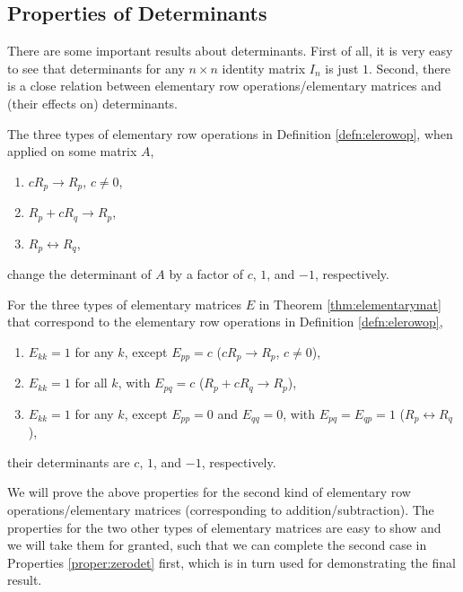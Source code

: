 \subsection{Properties of Determinants} There are some important results about determinants. First of all, it is very easy to see that determinants for any $n \times n$ identity matrix $I_n$ is just $1$. Second, there is a close relation between elementary row operations/elementary matrices and (their effects on) determinants.
\begin{proper}
\label{proper:elementaryopdet}
The three types of elementary row operations in Definition \ref{defn:elerowop}, when applied on some matrix $A$,
\begin{enumerate}
\item $cR_{p} \to R_{p}$, $c \neq 0$,
\item $R_{p} + cR_{q} \to R_{p}$,
\item $R_{p} \leftrightarrow R_{q}$,
\end{enumerate}
change the determinant of $A$ by a factor of $c$, $1$, and $-1$, respectively.
\end{proper}
\begin{proper}
\label{proper:elementarymatdet}
For the three types of elementary matrices $E$ in Theorem \ref{thm:elementarymat} that correspond to the elementary row operations in Definition \ref{defn:elerowop},
\begin{enumerate}
\item $E_{kk} = 1$ for any $k$, except $E_{pp} = c$ ($cR_{p} \to R_{p}$, $c \neq 0$),
\item $E_{kk} = 1$ for all $k$, with $E_{pq} = c$ ($R_{p} + cR_{q} \to R_{p}$),
\item $E_{kk} = 1$ for any $k$, except $E_{pp} = 0$ and $E_{qq} = 0$, with $E_{pq} = E_{qp} = 1$ ($R_{p} \leftrightarrow R_{q}$),
\end{enumerate}
their determinants are $c$, $1$, and $-1$, respectively.
\end{proper}
We will prove the above properties for the second kind of elementary row operations/elementary matrices (corresponding to addition/subtraction). The properties for the two other types of elementary matrices are easy to show and we will take them for granted, such that we can complete the second case in Properties \ref{proper:zerodet} first, which is in turn used for demonstrating the final result.
